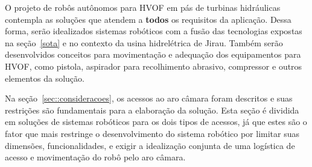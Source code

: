 O projeto de robôs autônomos para HVOF em pás de turbinas hidráulicas contempla
as soluções que atendem a \textbf{todos} os requisitos da aplicação. Dessa
forma, serão idealizados sistemas robóticos com a fusão das tecnologias expostas
na seção~\ref{sota} e no contexto da usina hidrelétrica de Jirau. Também serão
desenvolvidos conceitos para movimentação e adequação dos equipamentos para
HVOF, como pistola, aspirador para recolhimento abrasivo, compressor e outros
elementos da solução.

Na seção~\ref{sec::consideracoes}, os acessos ao aro câmara foram
descritos e suas restrições são fundamentais para a elaboração da solução.
Esta seção é dividida em soluções de sistemas robóticos para os dois tipos
de acessos, já que estes são o fator que mais restringe o desenvolvimento do
sistema robótico por limitar suas dimensões, funcionalidades, e exigir a
idealização conjunta de uma logística de acesso e movimentação do robô pelo aro
câmara.
